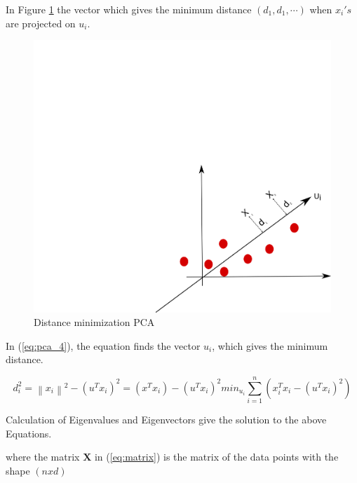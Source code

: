 In Figure \ref{fig:pca_step3} the vector which gives the minimum distance $(d_1,d_1, \cdots)$ when $x_i's$ are projected on $u_i$. 

\begin{figure}[H]
\centering
\includegraphics[scale=0.7]{imagens/pca3.png}
\caption{Distance minimization PCA}
\label{fig:pca_step3}
\end{figure}

In (\ref{eq:pca_4}), the equation finds the vector $u_i$, which gives the minimum distance. 

\begin{subequations}
    \label{eq:pca_4}
    \begin{equation}
        d_i^2 = \left \| x_i \right \|^2 - \left ( u^Tx_i \right )^2
    \end{equation}
    \begin{equation}
        = \left ( x^Tx_i \right ) - (u^Tx_i)^2
    \end{equation}
    \begin{equation}
        min_{u_i} \sum_{i=1}^{n}\left ( x_i^Tx_i - \left ( u^Tx_i \right )^2 \right )
    \end{equation}
\end{subequations}

Calculation of Eigenvalues and Eigenvectors give the solution to the above Equations. 

where the matrix $\mathbf{X}$ in (\ref{eq:matrix}) is the matrix of the data points with the shape $(n x d)$

